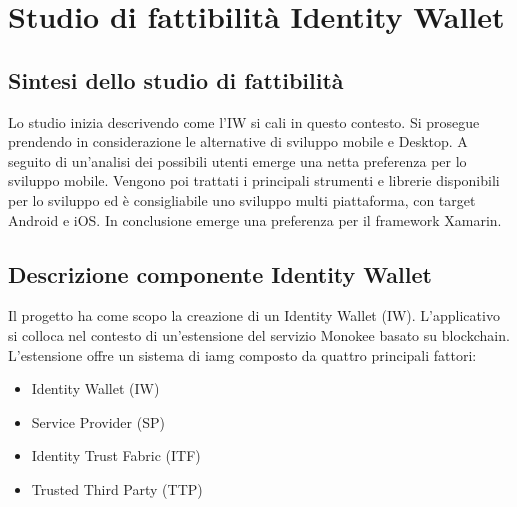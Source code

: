 
\section{Studio di fattibilità Identity Wallet}
\subsection{Sintesi dello studio di fattibilità}
Lo studio inizia descrivendo come l’IW si cali in questo contesto. Si prosegue prendendo in considerazione le alternative di sviluppo mobile e Desktop. A seguito di un’analisi dei possibili utenti emerge una netta preferenza per lo sviluppo mobile.
Vengono poi trattati i principali strumenti e librerie disponibili per lo sviluppo ed è consigliabile uno sviluppo multi piattaforma, con target Android e iOS. In conclusione emerge una preferenza per il framework Xamarin.
\subsection{Descrizione componente Identity Wallet} 
Il progetto ha come scopo la creazione di un Identity Wallet (IW). L’applicativo si colloca nel contesto di un’estensione del servizio Monokee basato su blockchain. L’estensione offre un sistema di \gls{iamg} composto da quattro principali fattori:
\begin{itemize}
    \item Identity Wallet (IW)
    \item Service Provider (SP)
    \item Identity Trust Fabric (ITF)
    \item Trusted Third Party (TTP)
\end{itemize}
    
